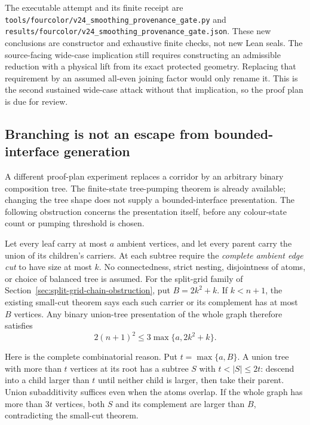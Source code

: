 The executable attempt and its finite receipt are
\texttt{tools/fourcolor/v24\_smoothing\_provenance\_gate.py} and
\texttt{results/fourcolor/v24\_smoothing\_provenance\_gate.json}.
These new conclusions are constructor and exhaustive finite checks,
not new Lean seals. The source-facing wide-case implication still
requires constructing an admissible reduction with a physical lift
from its exact protected geometry. Replacing that requirement by an
assumed all-even joining factor would only rename it. This is the
second sustained wide-case attack without that implication, so the
proof plan is due for review.

\subsection{Branching is not an escape from bounded-interface generation}
\label{sec:branching-interface-obstruction}

A different proof-plan experiment replaces a corridor by an arbitrary
binary composition tree. The finite-state tree-pumping theorem is already
available; changing the tree shape does not supply a bounded-interface
presentation. The following obstruction concerns the presentation itself,
before any colour-state count or pumping threshold is chosen.

Let every leaf carry at most $a$ ambient vertices, and let every parent
carry the union of its children's carriers. At each subtree require the
\emph{complete ambient edge cut} to have size at most $k$. No connectedness,
strict nesting, disjointness of atoms, or choice of balanced tree is assumed.
For the split-grid family of Section~\ref{sec:split-grid-chain-obstruction},
put $B=2k^2+k$. If $k<n+1$, the existing small-cut theorem says each such
carrier or its complement has at most $B$ vertices. Any binary union-tree
presentation of the whole graph therefore satisfies
\[
  2(n+1)^2 \leq 3\max\{a,2k^2+k\}.
\]

Here is the complete combinatorial reason. Put $t=\max\{a,B\}$. A union
tree with more than $t$ vertices at its root has a subtree $S$ with
$t<|S|\leq2t$: descend into a child larger than $t$ until neither child
is larger, then take their parent. Union subadditivity suffices even
when the atoms overlap. If the whole graph has more than $3t$ vertices,
both $S$ and its complement are larger than $B$, contradicting the
small-cut theorem.

